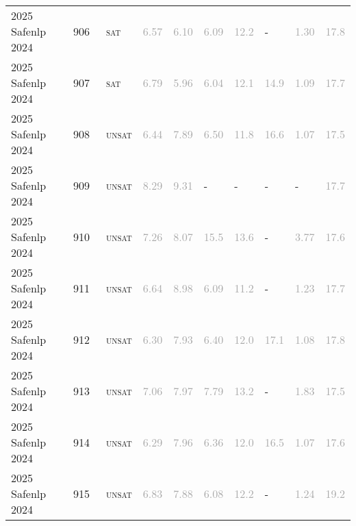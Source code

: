 \begin{center}
{\begin{longtable}{@{}llllllllll@{}}
2025 Safenlp 2024 & 906 & ~\textsc{sat} & \textcolor{darkgray}{6.57} & \textcolor{darkgray}{6.10} & \textcolor{darkgray}{6.09} & \textcolor{darkgray}{12.2} & - & \textcolor{darkgray}{1.30} & \textcolor{darkgray}{17.8} \\
2025 Safenlp 2024 & 907 & ~\textsc{sat} & \textcolor{darkgray}{6.79} & \textcolor{darkgray}{5.96} & \textcolor{darkgray}{6.04} & \textcolor{darkgray}{12.1} & \textcolor{darkgray}{14.9} & \textcolor{darkgray}{1.09} & \textcolor{darkgray}{17.7} \\
2025 Safenlp 2024 & 908 & ~\textsc{unsat} & \textcolor{darkgray}{6.44} & \textcolor{darkgray}{7.89} & \textcolor{darkgray}{6.50} & \textcolor{darkgray}{11.8} & \textcolor{darkgray}{16.6} & \textcolor{darkgray}{1.07} & \textcolor{darkgray}{17.5} \\
2025 Safenlp 2024 & 909 & ~\textsc{unsat} & \textcolor{darkgray}{8.29} & \textcolor{darkgray}{9.31} & - & - & - & - & \textcolor{darkgray}{17.7} \\
2025 Safenlp 2024 & 910 & ~\textsc{unsat} & \textcolor{darkgray}{7.26} & \textcolor{darkgray}{8.07} & \textcolor{darkgray}{15.5} & \textcolor{darkgray}{13.6} & - & \textcolor{darkgray}{3.77} & \textcolor{darkgray}{17.6} \\
2025 Safenlp 2024 & 911 & ~\textsc{unsat} & \textcolor{darkgray}{6.64} & \textcolor{darkgray}{8.98} & \textcolor{darkgray}{6.09} & \textcolor{darkgray}{11.2} & - & \textcolor{darkgray}{1.23} & \textcolor{darkgray}{17.7} \\
2025 Safenlp 2024 & 912 & ~\textsc{unsat} & \textcolor{darkgray}{6.30} & \textcolor{darkgray}{7.93} & \textcolor{darkgray}{6.40} & \textcolor{darkgray}{12.0} & \textcolor{darkgray}{17.1} & \textcolor{darkgray}{1.08} & \textcolor{darkgray}{17.8} \\
2025 Safenlp 2024 & 913 & ~\textsc{unsat} & \textcolor{darkgray}{7.06} & \textcolor{darkgray}{7.97} & \textcolor{darkgray}{7.79} & \textcolor{darkgray}{13.2} & - & \textcolor{darkgray}{1.83} & \textcolor{darkgray}{17.5} \\
2025 Safenlp 2024 & 914 & ~\textsc{unsat} & \textcolor{darkgray}{6.29} & \textcolor{darkgray}{7.96} & \textcolor{darkgray}{6.36} & \textcolor{darkgray}{12.0} & \textcolor{darkgray}{16.5} & \textcolor{darkgray}{1.07} & \textcolor{darkgray}{17.6} \\
2025 Safenlp 2024 & 915 & ~\textsc{unsat} & \textcolor{darkgray}{6.83} & \textcolor{darkgray}{7.88} & \textcolor{darkgray}{6.08} & \textcolor{darkgray}{12.2} & - & \textcolor{darkgray}{1.24} & \textcolor{darkgray}{19.2} \\

\end{longtable}}
\end{center}
